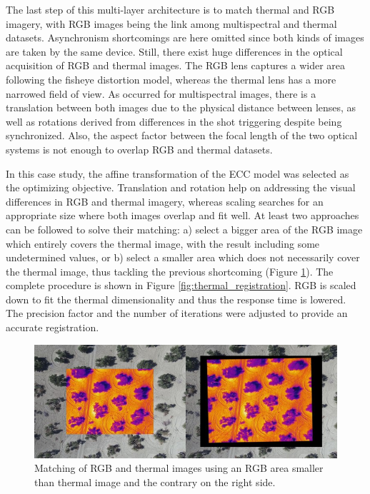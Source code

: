 The last step of this multi-layer architecture is to match thermal and RGB imagery, with RGB images being the link among multispectral and thermal datasets. Asynchronism shortcomings are here omitted since both kinds of images are taken by the same device. Still, there exist huge differences in the optical acquisition of RGB and thermal images. The RGB lens captures a wider area following the fisheye distortion model, whereas the thermal lens has a more narrowed field of view. As occurred for multispectral images, there is a translation between both images due to the physical distance between lenses, as well as rotations derived from differences in the shot triggering despite being synchronized. Also, the aspect factor between the focal length of the two optical systems is not enough to overlap RGB and thermal datasets. 

In this case study, the affine transformation of the ECC model was selected as the optimizing objective. Translation and rotation help on addressing the visual differences in RGB and thermal imagery, whereas scaling searches for an appropriate size where both images overlap and fit well. At least two approaches can be followed to solve their matching: a) select a bigger area of the RGB image which entirely covers the thermal image, with the result including some undetermined values, or b) select a smaller area which does not necessarily cover the thermal image, thus tackling the previous shortcoming (Figure \ref{fig:thermal_comparative}). The complete procedure is shown in Figure \ref{fig:thermal_registration}. RGB is scaled down to fit the thermal dimensionality and thus the response time is lowered. The precision factor and the number of iterations were adjusted to provide an accurate registration. 

\begin{figure}
    \includegraphics{figs/image_fusion/thermal_comparative.png}
    \caption{Matching of RGB and thermal images using an RGB area smaller than thermal image and the contrary on the right side. }
    \label{fig:thermal_comparative}
\end{figure}


